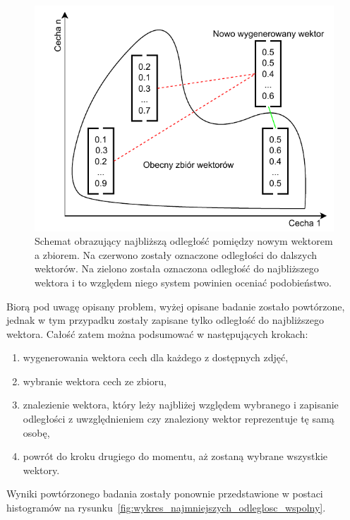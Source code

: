 \begin{figure}[H]
    \centering
    \includegraphics[width=1\textwidth]{./images/dlaczego_najmniejsze}
    \caption{ Schemat obrazujący najbliższą odległość pomiędzy nowym wektorem a zbiorem.
    Na czerwono zostały oznaczone odległości do dalszych wektorów. Na zielono została oznaczona odległość
    do najbliższego wektora i to względem niego system powinien oceniać podobieństwo.
    }
    \customsource
    \label{fig:najmniejsze}
\end{figure}

\pagebreak

Biorą pod uwagę opisany problem, wyżej opisane badanie zostało powtórzone, jednak w tym przypadku
zostały zapisane tylko odległość do najbliższego wektora.
Całość zatem można podsumować w następujących krokach:
\begin{enumerate}
    \item wygenerowania wektora cech dla każdego z dostępnych zdjęć,
    \item wybranie wektora cech ze zbioru,
    \item znalezienie wektora, który leży najbliżej względem wybranego i zapisanie odległości
    z uwzględnieniem czy znaleziony wektor reprezentuje tę samą osobę,
    \item powrót do kroku drugiego do momentu, aż zostaną wybrane wszystkie wektory.
\end{enumerate}
Wyniki powtórzonego badania zostały ponownie przedstawione w postaci
histogramów na rysunku~\ref{fig:wykres_najmniejszych_odleglosc_wspolny}.

